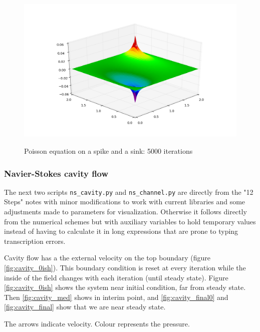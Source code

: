 \documentclass[11pt]{article}
\begin{document}
{	\begin{figure}[H]
	\centering
	\caption{Poisson equation on a spike and a sink: 5000 iterations}
	\includegraphics[scale=0.7]{poisson_5000.png}
	\label{fig:poisson_5000}
	\end{figure}
	
\subsubsection{Navier-Stokes cavity flow}
The next two scripts \texttt{ns\_cavity.py} and \texttt{ns\_channel.py} are directly from
the "12 Steps" notes with minor modifications to work with current libraries and some
adjustments made to parameters for visualization.
Otherwise it follows directly from the numerical schemes
but with auxiliary variables to hold temporary values instead of having to calculate
it in long expressions that are prone to typing transcription errors.

Cavity flow has a the external velocity on the top boundary (figure \ref{fig:cavity_0ish}).
This boundary condition is reset at every iteration while the inside of the field
changes with each iteration (until steady state). Figure \ref{fig:cavity_0ish} shows
the system near initial condition, far from steady state. Then \ref{fig:cavity_med}
shows in interim point, and \ref{fig:cavity_final0} and \ref{fig:cavity_final} show
that we are near steady state.

The arrows indicate velocity. Colour represents the pressure.

}
\end{document}
